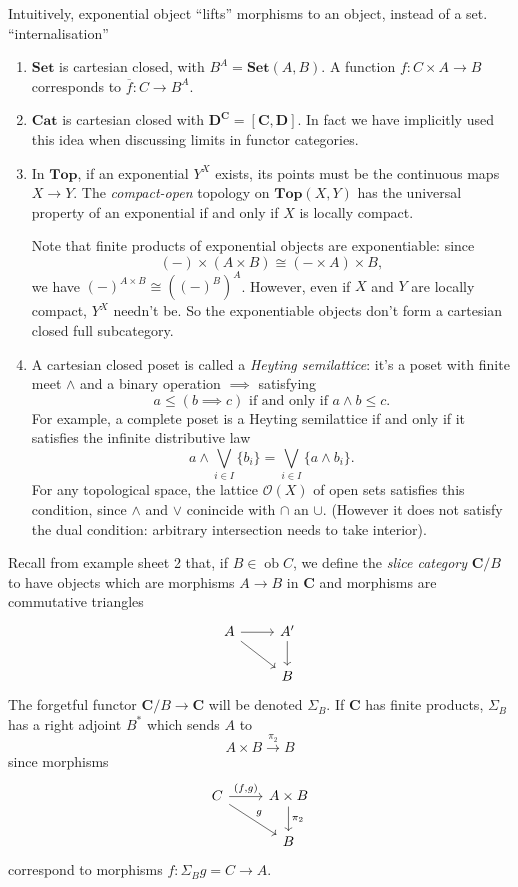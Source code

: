 \documentclass[a4paper]{article}
\renewcommand{\c}[1]{\mathbf{#1}}
\DeclareMathOperator{\ob}{ob}
\newcommand{\Set}{{\c{Set}}}
\newcommand{\Top}{{\c{Top}}}
\begin{document}
Intuitively, exponential object ``lifts'' morphisms to an object, instead of a set. ``internalisation''

\begin{eg}\leavevmode
  \begin{enumerate}
  \item \(\Set\) is cartesian closed, with \(B^A = \Set(A, B)\). A function \(f: C \times A \to B\) corresponds to \(\overline f: C \to B^A\).
  \item \(\c{Cat}\) is cartesian closed with \(\c D^{\c C} = [\c C, \c D]\). In fact we have implicitly used this idea when discussing limits in functor categories.
  \item In \(\Top\), if an exponential \(Y^X\) exists, its points must be the continuous maps \(X \to Y\). The \emph{compact-open} topology on \(\c{Top}(X, Y)\) has the universal property of an exponential if and only if \(X\) is locally compact.

    Note that finite products of exponential objects are exponentiable: since
    \[
      (-) \times (A \times B) \cong (- \times A) \times B,
    \]
    we have \((-)^{A \times B} \cong ((-)^B)^A\). However, even if \(X\) and \(Y\) are locally compact, \(Y^X\) needn't be. So the exponentiable objects don't form a cartesian closed full subcategory.
  \item A cartesian closed poset is called a \emph{Heyting semilattice}: it's a poset with finite meet \(\wedge\) and a binary operation \(\implies\) satisfying
    \[
      a \leq (b \implies c) \text{ if and only if } a \wedge b \leq c.
    \]
    For example, a complete poset is a Heyting semilattice if and only if it satisfies the infinite distributive law
    \[
      a \wedge \bigvee_{i \in I} \{b_i\} = \bigvee_{i \in I} \{a \wedge b_i\}.
    \]
    For any topological space, the lattice \(\mathcal O(X)\) of open sets satisfies this condition, since \(\wedge\) and \(\vee\) conincide with \(\cap\) an \(\cup\). (However it does not satisfy the dual condition: arbitrary intersection needs to take interior).
  \end{enumerate}
\end{eg}

Recall from example sheet 2 that, if \(B \in \ob C\), we define the \emph{slice category} \(\c C /B\) to have objects which are morphisms \(A \to B\) in \(\c C\) and morphisms are commutative triangles
\[
  \begin{tikzcd}
    A \ar[r] \ar[dr] & A' \ar[d] \\
    & B
  \end{tikzcd}
\]
The forgetful functor \(\c C/B \to \c C\) will be denoted \(\Sigma_B\). If \(\c C\) has finite products, \(\Sigma_B\) has a right adjoint \(B^*\) which sends \(A\) to
\[
  A \times B \xrightarrow{\pi_2} B
\]
since morphisms
\[
  \begin{tikzcd}
    C \ar[r, "{(f, g)}"] \ar[dr, "g"] & A \times B \ar[d, "\pi_2"] \\
    & B
  \end{tikzcd}
\]
correspond to morphisms \(f: \Sigma_Bg = C \to A\).
\end{document}
